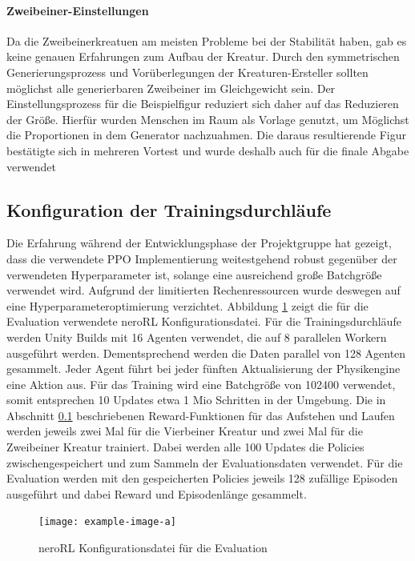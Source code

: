 \paragraph{Zweibeiner-Einstellungen}
Da die Zweibeinerkreatuen am meisten Probleme bei der Stabilität haben, gab es keine genauen Erfahrungen zum Aufbau der Kreatur. Durch den symmetrischen Generierungsprozess und Vorüberlegungen der Kreaturen-Ersteller sollten möglichst alle generierbaren Zweibeiner im Gleichgewicht sein. Der Einstellungsprozess für die Beispielfigur reduziert sich daher auf das Reduzieren der Größe. Hierfür wurden Menschen im Raum als Vorlage genutzt, um Möglichst die Proportionen in dem Generator nachzuahmen. Die daraus resultierende Figur bestätigte sich in mehreren Vortest und wurde deshalb auch für die finale Abgabe verwendet

\subsection{Konfiguration der Trainingsdurchläufe}
Die Erfahrung während der Entwicklungsphase der Projektgruppe hat gezeigt, dass die verwendete PPO Implementierung weitestgehend robust gegenüber der verwendeten Hyperparameter ist, solange eine ausreichend große Batchgröße verwendet wird. Aufgrund der limitierten Rechenressourcen wurde deswegen auf eine Hyperparameteroptimierung verzichtet. Abbildung \ref{fig:evaluation_config} zeigt die für die Evaluation verwendete neroRL Konfigurationsdatei. 
Für die Trainingsdurchläufe werden Unity Builds mit 16 Agenten verwendet, die auf 8 parallelen Workern ausgeführt werden. Dementsprechend werden die Daten parallel von 128 Agenten gesammelt. Jeder Agent führt bei jeder fünften Aktualisierung der Physikengine eine Aktion aus. Für das Training wird eine Batchgröße von 102400 verwendet, somit entsprechen 10 Updates etwa 1 Mio Schritten in der Umgebung.
Die in Abschnitt \ref{} beschriebenen Reward-Funktionen für das Aufstehen und Laufen werden jeweils zwei Mal für die Vierbeiner Kreatur und zwei Mal für die Zweibeiner Kreatur trainiert. Dabei werden alle 100 Updates die Policies zwischengespeichert und zum Sammeln der Evaluationsdaten verwendet. Für die Evaluation werden mit den gespeicherten Policies jeweils 128 zufällige Episoden ausgeführt und dabei Reward und Episodenlänge gesammelt.

\begin{figure}[ht]
    \centering
    \texttt{[image: example-image-a]}
    \caption{neroRL Konfigurationsdatei für die Evaluation}\label{fig:evaluation_config}
\end{figure}



